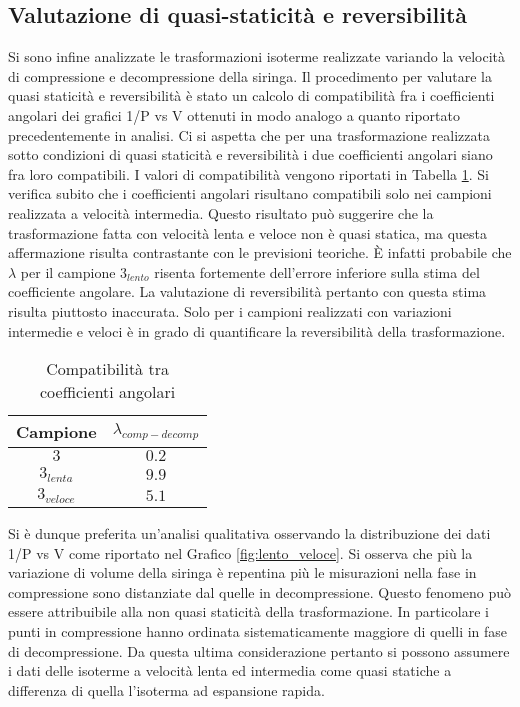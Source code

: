\documentclass[a4paper,11pt,oneside]{article}
\begin{document}
\subsection{Valutazione di quasi-staticità e reversibilità}
Si sono infine analizzate le trasformazioni isoterme realizzate variando la velocità di compressione e decompressione della siringa.
Il procedimento per valutare la quasi staticità e reversibilità è stato un calcolo di compatibilità fra i coefficienti angolari dei grafici 1/P vs V ottenuti in modo analogo a quanto riportato precedentemente in analisi. Ci si aspetta che per una trasformazione realizzata sotto condizioni di quasi staticità e reversibilità i due coefficienti angolari siano fra loro compatibili. I valori di compatibilità vengono riportati in Tabella \ref{tab:comp_ango_qs}. Si verifica subito che i coefficienti angolari risultano compatibili solo nei campioni realizzata a velocità intermedia. Questo risultato può suggerire che la trasformazione fatta con velocità lenta e veloce non è quasi statica, ma questa affermazione risulta contrastante con le previsioni teoriche. È infatti probabile che $\lambda$ per il campione $3_{lento}$ risenta fortemente dell'errore inferiore sulla stima del coefficiente angolare. La valutazione di reversibilità pertanto con questa stima risulta piuttosto inaccurata. Solo per i campioni realizzati con variazioni intermedie e veloci è in grado di quantificare la reversibilità della trasformazione.
\begin{table}[h!]
    \centering
    \begin{tabular}{|c|c|}
        \hline
        Campione & $\lambda_{comp-decomp}$\\ \hline
        \rowcolor[rgb]{0.85,0.85,0.85}$3$ & $0.2$\\ \hline
        $3_{lenta}$ & $9.9$\\ \hline
        \rowcolor[rgb]{0.85,0.85,0.85}$3_{veloce}$ & $5.1$\\ \hline
    \end{tabular}
    \caption{Compatibilità tra coefficienti angolari}
    \label{tab:comp_ango_qs}
\end{table}

Si è dunque preferita un'analisi qualitativa osservando la distribuzione dei dati 1/P vs V come riportato nel Grafico \ref{fig:lento_veloce}. Si osserva che più la variazione di volume della siringa è repentina più le misurazioni nella fase in compressione sono distanziate dal quelle in decompressione. Questo fenomeno può essere attribuibile alla non quasi staticità della trasformazione. In particolare i punti in compressione hanno ordinata sistematicamente maggiore di quelli in fase di decompressione. Da questa ultima considerazione pertanto si possono assumere i dati delle isoterme a velocità lenta ed intermedia come quasi statiche a differenza di quella l'isoterma ad espansione rapida.  
\end{document}
